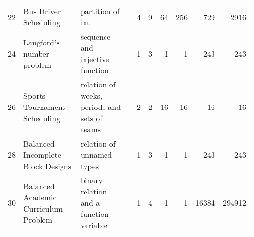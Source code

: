 \begin{sidewaystable}
\begin{center}
\begin{tabular}{r|l|l|l|r|r|r|r|r|r}
 22     &   Bus Driver Scheduling                                           &   partition of int                                                                                          &   \cite{curtis2000constructing}                                        & 4                & 9                & 64                                                   & 256                                   & 729                                                         & 2916                                                        \\
 24     &   Langford's number problem                                       &   sequence and injective function                                                                           &   \cite{akgun2018modelling, smith2000modelling}                        & 1                & 3                & 1                                                    & 1                                     & 243                                                         & 243                                                         \\
 26     &   Sports Tournament Scheduling                                    &   relation of weeks, periods and sets of teams                                                              &   \cite{schaerf1999scheduling}                                         & 2                & 2                & 16                                                   & 16                                    & 16                                                          & 16                                                          \\
 28     &   Balanced Incomplete Block Designs                               &   relation of unnamed types                                                                                 &   \cite{mt:AI01}                                                       & 1                & 3                & 1                                                    & 1                                     & 243                                                         & 243                                                         \\
 30     &   Balanced Academic Curriculum Problem                            &   binary relation and a function variable                                                                   &   \cite{Hnich02modellinga}                                             & 1                & 4                & 1                                                    & 1                                     & 16384                                                       & 294912                                                      \\

\end{tabular}
\end{center}
\end{sidewaystable}
